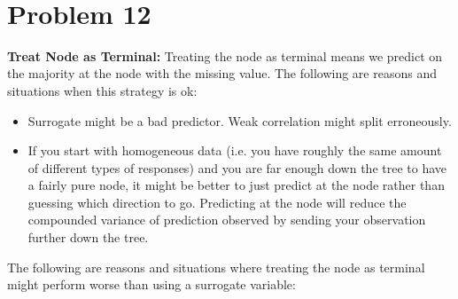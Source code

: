 \documentclass[11pt]{article}
\begin{document}
\begin{center}

\ \\
\end{center}


\section*{Problem 12}

\vspace{5 mm}
\noindent
{\bf Treat Node as Terminal:} Treating the node as terminal means we predict on 
the majority at the node with the missing value. The following are reasons and 
situations when this strategy is ok:

\begin{itemize}
\item Surrogate might be a bad predictor. Weak correlation might split 
erroneously.
\item If you start with homogeneous data (i.e. you have roughly the same amount 
of different types of responses) and you are far enough down the tree to have a 
fairly pure node, it might be better to just predict at the node rather than 
guessing which direction to go. Predicting at the node will reduce the 
compounded variance of prediction observed by sending your observation further 
down the tree.
\end{itemize}

\vspace{2 mm}
\noindent
The following are reasons and situations where treating the node as terminal 
might perform worse than using a surrogate variable:
\end{document}
